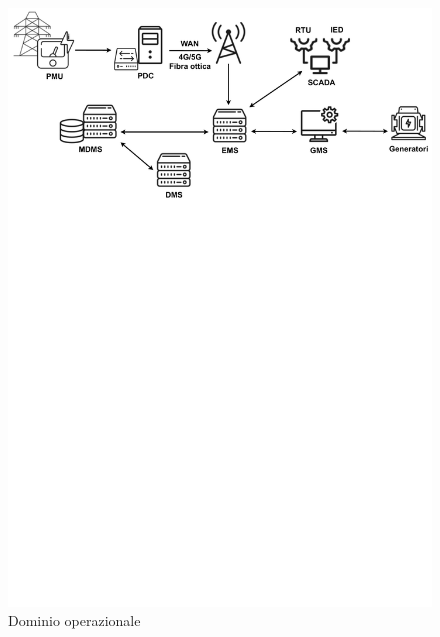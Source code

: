 \newpage
\begin{figure}[h!]
    \centering
    \includegraphics[trim= 0cm 57cm 0cm 0cm, clip, width=0.9\linewidth]{img/Operational-domain-v2.drawio.pdf}
    \caption{Dominio operazionale}
\end{figure}
